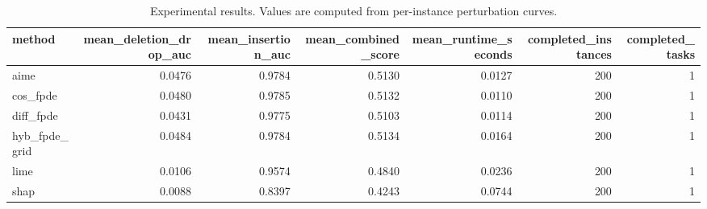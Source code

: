 \begin{table}[t]
\caption{Experimental results. Values are computed from per-instance perturbation curves.}
\label{tab:main_results_computed}
\centering
\begin{tabular}{lrrrrrr}
\toprule
method & mean\_deletion\_drop\_auc & mean\_insertion\_auc & mean\_combined\_score & mean\_runtime\_seconds & completed\_instances & completed\_tasks \\
\midrule
aime & 0.0476 & 0.9784 & 0.5130 & 0.0127 & 200 & 1 \\
cos\_fpde & 0.0480 & 0.9785 & 0.5132 & 0.0110 & 200 & 1 \\
diff\_fpde & 0.0431 & 0.9775 & 0.5103 & 0.0114 & 200 & 1 \\
hyb\_fpde\_grid & 0.0484 & 0.9784 & 0.5134 & 0.0164 & 200 & 1 \\
lime & 0.0106 & 0.9574 & 0.4840 & 0.0236 & 200 & 1 \\
shap & 0.0088 & 0.8397 & 0.4243 & 0.0744 & 200 & 1 \\
\bottomrule
\end{tabular}

\end{table}

